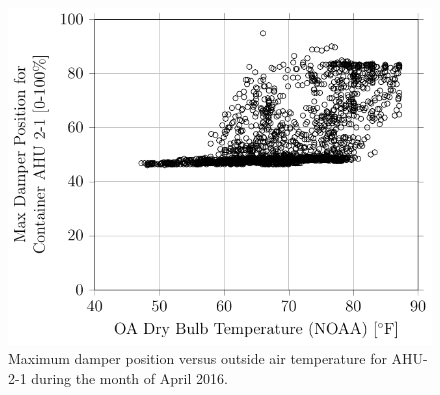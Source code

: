 \begin{figure}
\centering
\includegraphics{Plots/MaximumDamperPosition-2-1.pdf}
\caption{Maximum damper position versus outside air temperature for AHU-2-1 during the month of April 2016.}
\label{fig:MaxDamperPositionforContainerAHU21vsOADryBulbTemperatureNOAA}
\end{figure}

